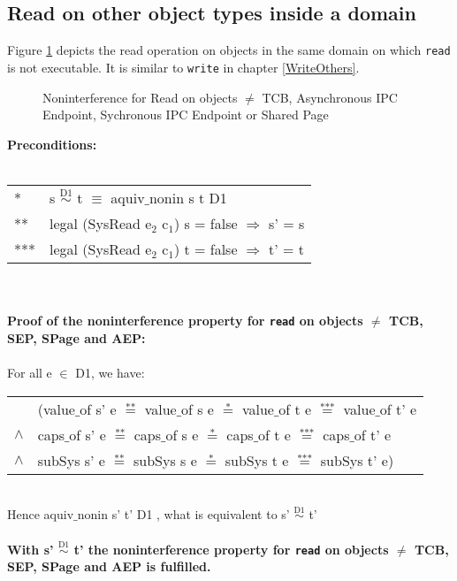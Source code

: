 \subsection{Read on other object types inside a domain} 
Figure \ref{fig:ReadOthers} depicts the read operation on objects in the same domain on which \texttt{read} is not executable. It is similar to \texttt{write} in chapter \ref{WriteOthers}.
\begin{figure}[H]
\caption{Noninterference for Read on objects $\neq$ TCB, Asynchronous IPC Endpoint, Sychronous IPC Endpoint or Shared Page}
\label{fig:ReadOthers}
\end{figure}
\textbf{Preconditions:} \\ \\
\begin{tabular}{ll}
* & s $\overset{\text{D1}}{\sim}$ t $\equiv$ aquiv$\_$nonin s t D1	\\ 
** & legal (SysRead e$_2$ c$_1$) s = false $\Rightarrow$ s' = s \\ 
*** & legal (SysRead e$_2$ c$_1$) t = false $\Rightarrow$ t' = t
\end{tabular} \\ \\ 
\textbf{Proof of the noninterference property for \texttt{read} on objects $\neq$ TCB, SEP, SPage and AEP:}\\ \\
For all e $\in$ D1, we have: \\ 
\begin{tabular}{ll}
& (value$\_$of s' e $\overset{\text{**}}{=}$ value$\_$of s e $\overset{\text{*}}{=}$ value$\_$of t e $\overset{\text{***}}{=}$ value$\_$of t' e \\
$\wedge$ & caps$\_$of s' e $\overset{\text{**}}{=}$ caps$\_$of s e $\overset{\text{*}}{=}$ caps$\_$of t e $\overset{\text{***}}{=}$ caps$\_$of t' e \\
$\wedge$ & subSys s' e $\overset{\text{**}}{=}$ subSys s e $\overset{\text{*}}{=}$ subSys t e $\overset{\text{***}}{=}$ subSys t' e)
\end{tabular} \\
Hence aquiv$\_$nonin s' t' D1 , what is equivalent to s' $\overset{\text{D1}}{\sim}$ t' \\ \\ 
\textbf{With s' $\overset{\text{D1}}{\sim}$ t' the noninterference property for \texttt{read} on objects $\neq$ TCB, SEP, SPage and AEP is fulfilled.}  
